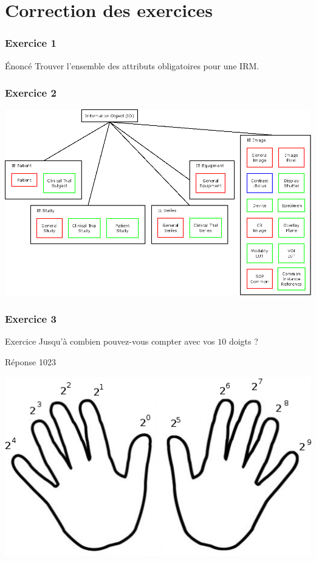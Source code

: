 \section{Correction des exercices}

\frame
{
    \frametitle{Exercice 1}
	\begin{block}{\'Enonc\'e}
		Trouver l'ensemble des attributs obligatoires pour une IRM.
	\end{block}
}

\frame
{
    \frametitle{Exercice 2}
    \includegraphics[width=\linewidth]{./figures/IO-definition-IE.png}

}

\frame
{
    \frametitle{Exercice 3}

    \begin{block}{Exercice}
        Jusqu'\`a combien pouvez-vous compter avec vos $10$ doigts ?
    \end{block}

    \begin{block}{R\'eponse}
        1023
    \end{block}

    \begin{center}
        \includegraphics[width=.5\linewidth]{./figures/digits.png}
    \end{center}

}

